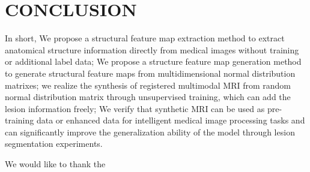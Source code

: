 \documentclass{ecai}
\begin{document}
\section{CONCLUSION}
In short, We propose a structural feature map extraction method to extract anatomical structure information directly from medical images without training or additional label data;
We propose a structure feature map generation method to generate structural feature maps from multidimensional normal distribution matrixes;
we realize the synthesis of registered multimodal MRI from random normal distribution matrix through unsupervised training, which can add the lesion information freely;
We verify that synthetic MRI can be used as pre-training data or enhanced data for intelligent medical image processing tasks and can significantly improve the generalization ability of the model through lesion segmentation experiments.

\ack We would like to thank the 


\end{document}
